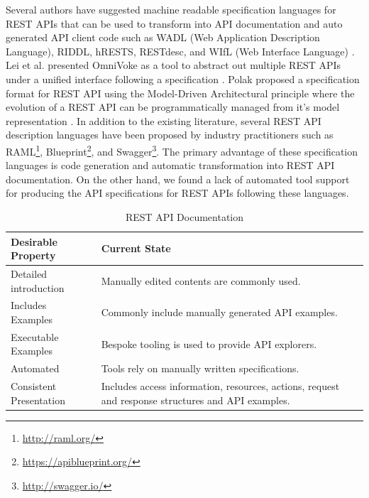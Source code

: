 \documentclass[10pt, conference]{IEEEtran}
\begin{document}
Several authors have suggested machine readable specification languages for REST APIs that can be used to transform into API documentation and auto generated API client code such as WADL (Web Application Description Language), RIDDL, hRESTS, RESTdesc, and WIfL (Web Interface Language) \cite{hadley2006web, mangler2010origin,Kopecky_hrests,RESTdesc,Danielsen_validation}. Lei et al. presented OmniVoke as a tool to abstract out multiple REST APIs under a unified interface following a specification \cite{Ning_omnivoke}. Polak proposed a specification format for REST API using the Model-Driven Architectural principle where the evolution of a REST API can be programmatically managed from it's model representation \cite{Polak:2015:RAM:2790798.2790820}. In addition to the existing literature, several REST API description languages have been proposed by industry practitioners such as RAML\footnote{\url{http://raml.org/}}, Blueprint\footnote{\url{https://apiblueprint.org/}}, and Swagger\footnote{\url{http://swagger.io/}}. The primary advantage of these specification languages is code generation and automatic transformation into REST API documentation. On the other hand, we found a lack of automated tool support for producing the API specifications for REST APIs following these languages.

\begin{table}[!tbh]
  \caption{REST API Documentation}
  \label{table:rest_apis}
\begin{tabular}{|p{1in} | p{2.2in}|}
\hline
\textbf{Desirable Property} & \textbf{Current State} \\
\hline
Detailed introduction &
Manually edited contents are commonly used.
 \\
\hline
Includes Examples &
Commonly include manually generated API examples.
 \\
\hline
Executable Examples &
Bespoke tooling is used to provide API explorers.
 \\
\hline
Automated &
Tools rely on manually written specifications.\\
\hline
Consistent Presentation &
Includes access information, resources, actions, request and response structures and API examples.\\
\hline
\end{tabular}
\end{table}
\end{document}
